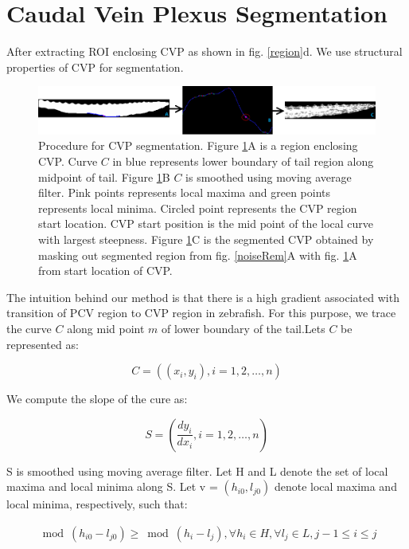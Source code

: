 \section{Caudal Vein Plexus Segmentation}

After extracting ROI enclosing CVP as shown in fig. \ref{region}d. We use structural properties of CVP for segmentation. 

\begin{figure}[htb] \centering
\includegraphics[scale = 0.55]{figure/cvpSeg.png}
	 \caption[CVP Segmentation]{Procedure for CVP segmentation. Figure \ref{seg}A is a region enclosing CVP. Curve $C$ in blue represents lower boundary of tail region along midpoint of tail. Figure \ref{seg}B $C$ is smoothed using moving average filter. Pink points represents local maxima and green points represents local minima. Circled point represents the CVP region start location. CVP start position is the mid point of the local curve with largest steepness. Figure \ref{seg}C is the segmented CVP obtained by masking out segmented region from fig. \ref{noiseRem}A with fig. \ref{seg}A from start location of CVP.}
 \label{seg}
\end{figure}

The intuition behind our method is that there is a high gradient associated with transition of PCV region to CVP region in zebrafish. For this purpose, we trace the curve $C$ along mid point $m$ of lower boundary of the tail.Lets $C$  be represented as:

					 \begin{equation}
						C =  ((x_{i}, y_{i}), i= 1,2,\ldots, n)						
						\end{equation} 
						
We compute the slope of the cure as: 

				\begin{equation}
				S =  (\frac{dy_{i}}{dx_{i}}, i= 1,2,\ldots, n)
				\end{equation} 
				
S is smoothed using moving average filter. Let H and L denote the set of local maxima and local minima along S. Let v = $(h_{i0}, l_{j0})$ denote local maxima and local minima, respectively, such that:

					  \begin{align*}
						\bmod(h_{i0} - l_{j0}) \geq \bmod(h_{i} - l_{j}), 
						    \forall h_{i} \in H, \forall l_{j} \in L,  j-1 \leq i \leq j
						\end{align*}  
						
